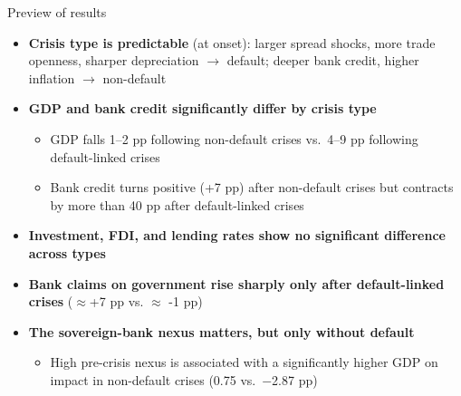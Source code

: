 \documentclass[aspectratio=169]{beamer}
\begin{document}

\begin{frame}{Preview of results}
 \footnotesize
  \begin{itemize}
    \item \textbf{Crisis type is predictable} (at onset): larger spread
    shocks, more trade openness, sharper depreciation $\to$ default;
    deeper bank credit, higher inflation $\to$ non-default

    \item \textbf{GDP and bank credit significantly differ by crisis type}
    \begin{itemize}
     \footnotesize
      \item GDP falls 1--2 pp following non-default crises vs.\ 4--9 pp
      following default-linked crises
      \item Bank credit turns positive (+7 pp) after non-default crises
      but contracts by more than 40 pp after default-linked crises
    \end{itemize}
    \item \textbf{Investment, FDI, and lending rates show no significant
    difference across types}
    \item \textbf{Bank claims on government rise sharply only after
    default-linked crises} ($\approx$+7 pp vs. $\approx$ -1 pp)

    \item \textbf{The sovereign-bank nexus matters, but only without
    default}
    \begin{itemize}
     \footnotesize
      \item High pre-crisis nexus is associated with a significantly
      higher GDP on impact in non-default crises (0.75 vs.\ $-$2.87 pp)
    \end{itemize}
  \end{itemize}
\end{frame}
\end{document}
